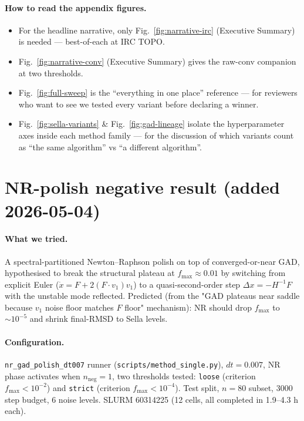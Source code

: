 \documentclass[11pt]{article}
\begin{document}
\paragraph{How to read the appendix figures.}
\begin{itemize}[leftmargin=1.5em]
\item For the headline narrative, only Fig.~\ref{fig:narrative-irc}
  (Executive Summary) is needed — best-of-each at IRC TOPO.
\item Fig.~\ref{fig:narrative-conv} (Executive Summary) gives the
  raw-conv companion at two thresholds.
\item Fig.~\ref{fig:full-sweep} is the ``everything in one place''
  reference — for reviewers who want to see we tested every variant
  before declaring a winner.
\item Fig.~\ref{fig:sella-variants} \& Fig.~\ref{fig:gad-lineage}
  isolate the hyperparameter axes inside each method family — for
  the discussion of which variants count as ``the same algorithm''
  vs ``a different algorithm''.
\end{itemize}

\section{NR-polish negative result (added 2026-05-04)}

\paragraph{What we tried.} A spectral-partitioned Newton--Raphson polish
on top of converged-or-near GAD, hypothesised to break the structural
plateau at $f_{\max}{\approx}0.01$ by switching from explicit Euler
($\dot x = F + 2(F\!\cdot\!v_1)v_1$) to a quasi-second-order step
$\Delta x = -H^{-1} F$ with the unstable mode reflected. Predicted (from
the "GAD plateaus near saddle because $v_1$ noise floor matches $F$
floor" mechanism): NR should drop $f_{\max}$ to $\sim 10^{-5}$ and shrink
final-RMSD to Sella levels.

\paragraph{Configuration.} \texttt{nr\_gad\_polish\_dt007} runner
(\texttt{scripts/method\_single.py}), $dt{=}0.007$, NR phase activates
when $n_{\text{neg}}{=}1$, two thresholds tested: \texttt{loose} (criterion
$f_{\max}{<}10^{-2}$) and \texttt{strict} (criterion $f_{\max}{<}10^{-4}$).
Test split, $n{=}80$ subset, 3000 step budget, 6 noise levels.
SLURM 60314225 (12 cells, all completed in 1.9--4.3 h each).
\end{document}
